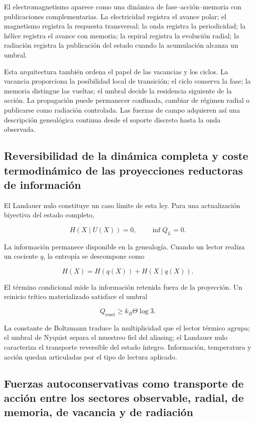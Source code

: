 El electromagnetismo aparece como una dinámica de fase–acción–memoria con publicaciones complementarias. La electricidad registra el avance polar; el magnetismo registra la respuesta transversal; la onda registra la periodicidad; la hélice registra el avance con memoria; la espiral registra la evolución radial; la radiación registra la publicación del estado cuando la acumulación alcanza un umbral.

Esta arquitectura también ordena el papel de las vacancias y los ciclos. La vacancia proporciona la posibilidad local de transición; el ciclo conserva la fase; la memoria distingue las vueltas; el umbral decide la residencia siguiente de la acción. La propagación puede permanecer confinada, cambiar de régimen radial o publicarse como radiación controlada. Las fuerzas de campo adquieren así una descripción genealógica continua desde el soporte discreto hasta la onda observada.

\subsection{Reversibilidad de la dinámica completa y coste termodinámico de las proyecciones reductoras de información}
El Landauer nulo constituye un caso límite de esta ley. Para una actualización biyectiva del estado completo,

\[
H(X\mid U(X))=0,
\qquad
\inf Q_L=0.
\]

La información permanece disponible en la genealogía. Cuando un lector realiza un cociente \(q\), la entropía se descompone como

\[
H(X)=H(q(X))+H(X\mid q(X)).
\]

El término condicional mide la información retenida fuera de la proyección. Un reinicio trítico materializado satisface el umbral

\[
Q_{\mathrm{reset}}\ge k_B\Theta\log 3.
\]

La constante de Boltzmann traduce la multiplicidad que el lector térmico agrupa; el umbral de Nyquist separa el muestreo fiel del aliasing; el Landauer nulo caracteriza el transporte reversible del estado íntegro. Información, temperatura y acción quedan articuladas por el tipo de lectura aplicado.

\subsection{Fuerzas autoconservativas como transporte de acción entre los sectores observable, radial, de memoria, de vacancia y de radiación}

